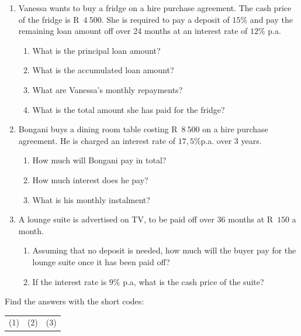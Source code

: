 \begin{exercises}{}{
    \begin{enumerate}[label=\textbf{\arabic*}.]
	\item Vanessa wants to buy a fridge on a hire purchase agreement. The cash price of the fridge is R~$4~500$. She is required to pay a deposit of $15\%$ and pay the remaining loan amount off over 24 months at an interest rate of $12\%$ p.a.
	\begin{enumerate}[noitemsep, label=\textbf{(\alph*)} ]
	    \item What is the principal loan amount?
	    \item What is the accumulated loan amount?
	    \item What are Vanessa’s monthly repayments?
	    \item What is the total amount she has paid for the fridge?
	\end{enumerate}


	\item Bongani buys a dining room table costing R~$8~500$ on a hire purchase agreement. He is charged an interest rate of $17,5\%$p.a. over 3 years.
	\begin{enumerate}[noitemsep, label=\textbf{(\alph*)} ]
	    \item How much will Bongani pay in total?
	    \item How much interest does he pay?
	    \item What is his monthly instalment?
	\end{enumerate}

	\item A lounge suite is advertised on TV, to be paid off over 36 months at R~$150$ a month.
	\begin{enumerate}[noitemsep, label=\textbf{(\alph*)} ]
	    \item Assuming that no deposit is needed, how much will the buyer pay for the lounge suite once it has been paid off?
	    \item If the interest rate is $9\%$ p.a, what is the cash price of the suite?\\
	\end{enumerate}
    \end{enumerate}

    Find the answers with the short codes:\\
    \begin{tabularx}{\textwidth}{ XXX }
	(1)	&	(2)	&	(3)\\
    \end{tabularx}
}
\end{exercises}


